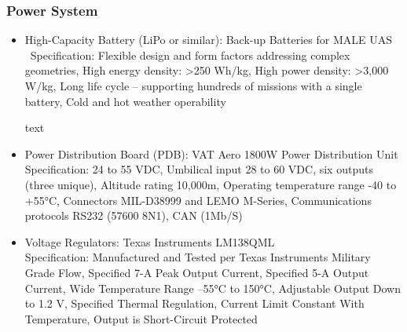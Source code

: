 \subsubsection{Power System}
\begin{itemize}
\item High-Capacity Battery (LiPo or similar):
Back-up Batteries for MALE UAS \
Specification: Flexible design and form factors addressing complex geometries, High energy density: >250 Wh/kg, High power density: >3,000 W/kg, Long life cycle – supporting hundreds of missions with a single battery, Cold and hot weather operability

text
\item Power Distribution Board (PDB):
VAT Aero 1800W Power Distribution Unit \\
Specification: 24 to 55 VDC, Umbilical input 28 to 60 VDC, six outputs (three unique),
Altitude rating 10,000m, Operating temperature range -40 to +55°C, Connectors MIL-D38999 and LEMO M-Series, Communications protocols RS232 (57600 8N1), CAN (1Mb/S)

\item Voltage Regulators:
Texas Instruments LM138QML \\
Specification: Manufactured and Tested per Texas Instruments
Military Grade Flow, Specified 7-A Peak Output Current, Specified 5-A Output Current, Wide Temperature Range –55°C to 150°C, Adjustable Output Down to 1.2 V, Specified Thermal Regulation, Current Limit Constant With Temperature, Output is Short-Circuit Protected
\end{itemize}

